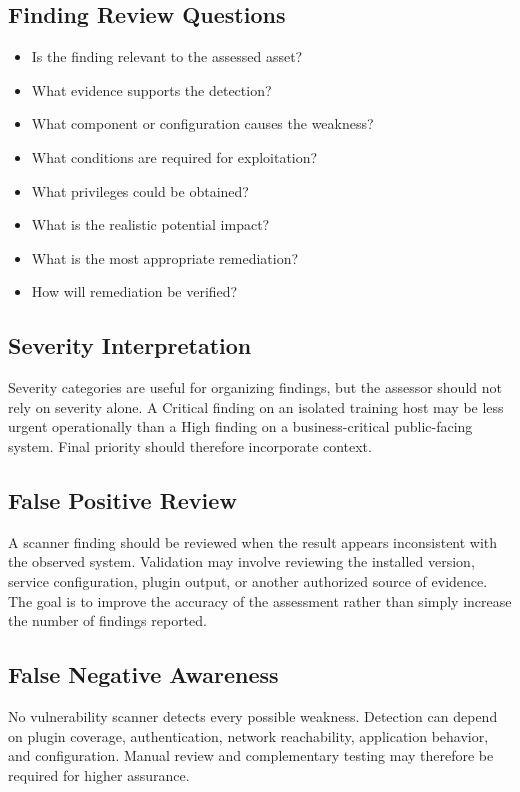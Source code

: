 \documentclass[11pt,a4paper]{article}
\begin{document}
\subsection{Finding Review Questions}
\begin{itemize}
\item Is the finding relevant to the assessed asset?
\item What evidence supports the detection?
\item What component or configuration causes the weakness?
\item What conditions are required for exploitation?
\item What privileges could be obtained?
\item What is the realistic potential impact?
\item What is the most appropriate remediation?
\item How will remediation be verified?
\end{itemize}

\subsection{Severity Interpretation}
Severity categories are useful for organizing findings, but the assessor should not rely on severity alone. A Critical finding on an isolated training host may be less urgent operationally than a High finding on a business-critical public-facing system. Final priority should therefore incorporate context.

\subsection{False Positive Review}
A scanner finding should be reviewed when the result appears inconsistent with the observed system. Validation may involve reviewing the installed version, service configuration, plugin output, or another authorized source of evidence. The goal is to improve the accuracy of the assessment rather than simply increase the number of findings reported.

\subsection{False Negative Awareness}
No vulnerability scanner detects every possible weakness. Detection can depend on plugin coverage, authentication, network reachability, application behavior, and configuration. Manual review and complementary testing may therefore be required for higher assurance.
\end{document}

